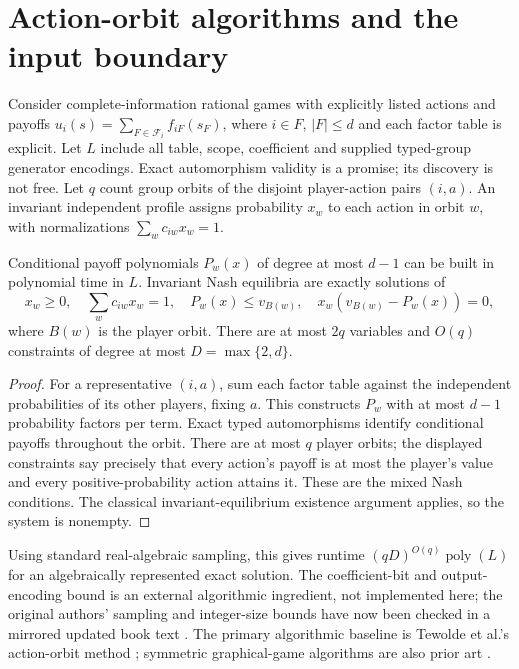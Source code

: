 \section{Action-orbit algorithms and the input boundary}\label{sec:07-phase11-3}
Consider complete-information rational games with explicitly listed actions
and payoffs $u_i(s)=\sum_{F\in\mathcal F_i}f_{iF}(s_F)$, where $i\in F$,
$|F|\le d$ and each factor table is explicit. Let $L$ include all table,
scope, coefficient and supplied typed-group generator encodings. Exact
automorphism validity is a promise; its discovery is not free.
Let $q$ count group orbits of the disjoint player-action pairs $(i,a)$.
An invariant independent profile assigns probability $x_w$ to each action in
orbit $w$, with normalizations $\sum_w c_{iw}x_w=1$.

\begin{proposition}\label{result:07-phase11-3}
Conditional payoff polynomials $P_w(x)$ of degree at most $d-1$ can be built
in polynomial time in $L$. Invariant Nash equilibria are exactly solutions of
\[
 x_w\ge0,\quad \sum_w c_{iw}x_w=1,\quad
 P_w(x)\le v_{B(w)},\quad
 x_w(v_{B(w)}-P_w(x))=0,
\]
where $B(w)$ is the player orbit. There are at most $2q$ variables and
$O(q)$ constraints of degree at most $D=\max\{2,d\}$.
\end{proposition}
\begin{proof}
For a representative $(i,a)$, sum each factor table against the independent
probabilities of its other players, fixing $a$. This constructs $P_w$ with
at most $d-1$ probability factors per term. Exact typed automorphisms identify
conditional payoffs throughout the orbit. There are at most $q$ player orbits;
the displayed constraints say precisely that every action's payoff is at most
the player's value and every positive-probability action attains it. These
are the mixed Nash conditions. The classical invariant-equilibrium existence
argument applies, so the system is nonempty.
\end{proof}

Using standard real-algebraic sampling, this gives runtime
$(qD)^{O(q)}\operatorname{poly}(L)$ for an algebraically represented exact
solution. The coefficient-bit and output-encoding bound is an external
algorithmic ingredient, not implemented here; the original authors' sampling and integer-size bounds have now been checked
in a mirrored updated book text \citep{basu2016posted}. The primary algorithmic
baseline is Tewolde et al.'s action-orbit method \citep{tewolde2025}; symmetric
graphical-game algorithms are also prior art \citep{brandt2011}.

